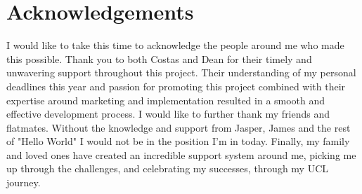 \chapter*{Acknowledgements}
I would like to take this time to acknowledge the people around me who made this possible. Thank you to both Costas and Dean for their timely and unwavering support throughout this project. Their understanding of my personal deadlines this year and passion for promoting this project combined with their expertise around marketing and implementation resulted in a smooth and effective development process. 
I would like to further thank my friends and flatmates. Without the knowledge and support from Jasper, James and the rest of "Hello World" I would not be in the position I'm in today. 
Finally, my family and loved ones have created an incredible support system around me, picking me up through the challenges, and celebrating my successes, through my UCL journey.
